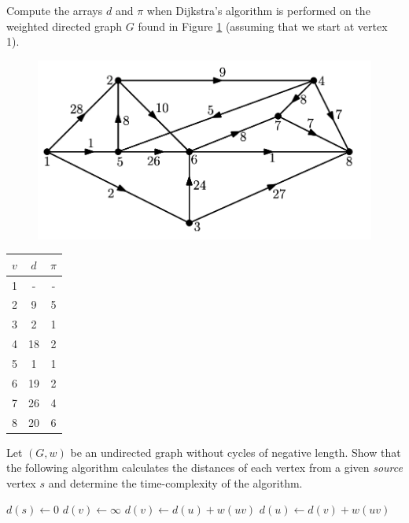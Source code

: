 
\question Compute the arrays $d$ and $\pi$ when Dijkstra's algorithm is performed 
on the weighted directed graph $G$ found in Figure \ref{fig:pc-01-1}
(assuming that we start at vertex 1).
\begin{figure}[]
    \centering
    \includegraphics[width=0.8\linewidth]{images/pc-01-1.png}
    \caption{}
    \label{fig:pc-01-1}
\end{figure}
 \begin{solution}
    \begin{center}
        \begin{tabular}{ccc}
            \toprule
            $v$ & $d$ & $\pi$ \\
            \midrule
            1 & - & - \\
            2 & 9 & 5 \\
            3 & 2 & 1 \\
            4 & 18 & 2 \\
            5 & 1 & 1 \\
            6 & 19 & 2 \\
            7 & 26 & 4 \\
            8 & 20 & 6 \\ 
            \bottomrule
        \end{tabular}
    \end{center}
\end{solution}

\question Let $(G, w)$ be an undirected graph without cycles of negative length.
Show that the following algorithm calculates the distances of each vertex
from a given \emph{source} vertex $s$ and determine the time-complexity of the
algorithm.
\begin{algorithm}
    \begin{algorithmic}[1]
            \State $d(s) \gets 0$
                \State $d(v) \gets \infty$
            \EndFor
                        \State $d(v) \gets d(u) + w(uv)$
                    \EndIf
                        \State $d(u) \gets d(v) + w(uv)$
                    \EndIf
                \EndFor
            \EndFor
        \EndProcedure
    \end{algorithmic}
\end{algorithm}


